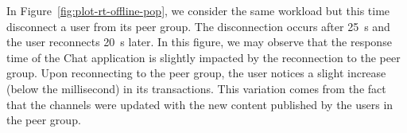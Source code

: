 In Figure~\ref{fig:plot-rt-offline-pop}, 
we consider the same workload but this time disconnect a user from its peer 
group.
The disconnection occurs after 25~s and the user reconnects 20~s later.
In this figure, 
we may observe that the response time of the \system{}Chat application is slightly impacted
by the reconnection to the peer group.
Upon reconnecting to the peer group, 
the user notices a slight increase (below the millisecond) in its transactions.
This variation comes from the fact that the channels were updated with the new 
content published by the users in the peer group.
